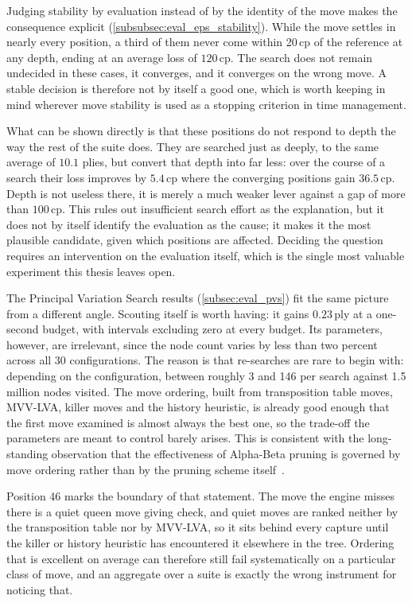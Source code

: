 Judging stability by evaluation instead of by the identity of the move makes the
consequence explicit (\cref{subsubsec:eval_eps_stability}). While the move
settles in nearly every position, a third of them never come within 20\,cp of the
reference at any depth, ending at an average loss of $120$\,cp. The search does
not remain undecided in these cases, it converges, and it converges on the wrong
move. A stable decision is therefore not by itself a good one, which is worth
keeping in mind wherever move stability is used as a stopping criterion in
time management.

What can be shown directly is that these positions do not respond to depth the way
the rest of the suite does. They are searched just as deeply, to the same average
of $10.1$ plies, but convert that depth into far less: over the course of a search
their loss improves by $5.4$\,cp where the converging positions gain $36.5$\,cp.
Depth is not useless there, it is merely a much weaker lever against a gap of more
than $100$\,cp. This rules out insufficient search effort as the explanation, but
it does not by itself identify the evaluation as the cause; it makes it the most
plausible candidate, given which positions are affected. Deciding the question
requires an intervention on the evaluation itself, which is the single most
valuable experiment this thesis leaves open.

The Principal Variation Search results (\cref{subsec:eval_pvs}) fit the same
picture from a different angle. Scouting itself is worth having: it gains
$0.23$\,ply at a one-second budget, with intervals excluding zero at every budget.
Its parameters, however, are irrelevant, since the node count varies by less than
two percent across all 30 configurations. The reason is that re-searches are rare
to begin with: depending on the configuration, between roughly 3 and 146 per
search against 1.5 million nodes visited. The move ordering, built from transposition table moves, MVV-LVA, killer
moves and the history heuristic, is already good enough that the first move
examined is almost always the best one, so the trade-off the parameters are meant
to control barely arises. This is consistent with the long-standing observation
that the effectiveness of Alpha-Beta pruning is governed by move ordering rather
than by the pruning scheme itself~\cite{knuth1975alphabeta, marsland1986review}.

Position 46 marks the boundary of that statement. The move the engine misses
there is a quiet queen move giving check, and quiet moves are ranked neither by
the transposition table nor by MVV-LVA, so it sits behind every capture until the
killer or history heuristic has encountered it elsewhere in the tree. Ordering
that is excellent on average can therefore still fail systematically on a
particular class of move, and an aggregate over a suite is exactly the wrong
instrument for noticing that.

